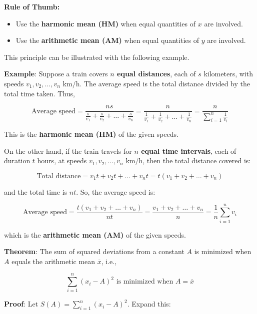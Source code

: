 \documentclass[twoside]{book}
\begin{document}
\medskip

\begin{textbox}
\textbf{Rule of Thumb:}
\begin{itemize}
    \item Use the \textbf{harmonic mean (HM)} when equal quantities of $x$ are involved.
    \item Use the \textbf{arithmetic mean (AM)} when equal quantities of $y$ are involved.
\end{itemize}
\end{textbox}

\medskip

This principle can be illustrated with the following example.

\textbf{Example}: Suppose a train covers \textbf{\( n \) equal distances}, each of \( s \) kilometers, with speeds \( v_1, v_2, \dots, v_n \) km/h. The average speed is the total distance divided by the total time taken. Thus,

\[
\text{Average speed} = \frac{ns}{\frac{s}{v_1} + \frac{s}{v_2} + \dots + \frac{s}{v_n}} 
= \frac{n}{\frac{1}{v_1} + \frac{1}{v_2} + \dots + \frac{1}{v_n}} 
= \frac{n}{\sum_{i=1}^n \frac{1}{v_i}}
\]

This is the \textbf{harmonic mean (HM)} of the given speeds.

\medskip

On the other hand, if the train travels for \textbf{\( n \) equal time intervals}, each of duration \( t \) hours, at speeds \( v_1, v_2, \dots, v_n \) km/h, then the total distance covered is:

\[
\text{Total distance} = v_1t + v_2t + \dots + v_nt = t(v_1 + v_2 + \dots + v_n)
\]

and the total time is \( nt \). So, the average speed is:

\[
\text{Average speed} = \frac{t(v_1 + v_2 + \dots + v_n)}{nt} = \frac{v_1 + v_2 + \dots + v_n}{n} 
= \frac{1}{n} \sum_{i=1}^n v_i
\]

which is the \textbf{arithmetic mean (AM)} of the given speeds.


\begin{textbox}
    \textbf{Theorem}: The sum of squared deviations from a constant \( A \) is minimized when \( A \) equals the arithmetic mean \( \overline{x} \), i.e.,

\[
\sum_{i=1}^n (x_i - A)^2 \text{ is minimized when } A = \overline{x}
\]
\end{textbox}

\textbf{Proof}: Let \( S(A) = \sum_{i=1}^n (x_i - A)^2 \). Expand this:
\end{document}
